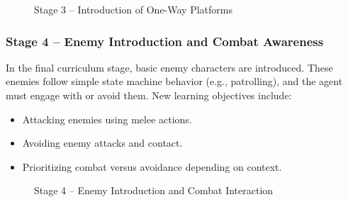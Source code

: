 \documentclass[12pt,oneside,openright,a4paper]{cpe-english-project}
\begin{document}
\begin{figure}[H]
\centering
{}
\caption{Stage 3 – Introduction of One-Way Platforms}\label{fig:Stage3}
\end{figure}

\subsubsection{Stage 4 – Enemy Introduction and Combat Awareness}

In the final curriculum stage, basic enemy characters are introduced. These enemies follow simple state machine behavior (e.g., patrolling), and the agent must engage with or avoid them. New learning objectives include:

\begin{itemize}
\item Attacking enemies using melee actions.
\item Avoiding enemy attacks and contact.
\item Prioritizing combat versus avoidance depending on context.
\end{itemize}

\begin{figure}[H]
\centering
{}
\caption{Stage 4 – Enemy Introduction and Combat Interaction}\label{fig:Stage4}
\end{figure}
\end{document}
